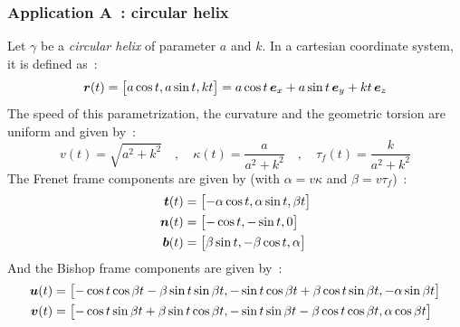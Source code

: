 \subsubsection{Application A~: circular helix}
Let $\gamma$ be a \emph{circular helix} of parameter $a$ and $k$. In a cartesian coordinate system, it is defined as~:
\begin{equation}
	\boldsymbol{r}(t) 
	=
	\begin{bmatrix}
		a \cos t, a \sin t, k t
	\end{bmatrix}
	= a \cos t \, \boldsymbol{e}_x + a \sin t \, \boldsymbol{e}_y + k t \, \boldsymbol{e}_z
\end{equation}
The speed of this parametrization, the curvature and the geometric torsion are uniform and given by~:
\begin{equation}
	v(t) = \sqrt{a^2+k^2}
	\quad,\quad
	\kappa(t) = \frac{a}{a^2 + k^2}
	\quad,\quad
	\tau_f(t) = \frac{k}{a^2 + k^2}
\end{equation}
The Frenet frame components are given by (with $\alpha = v \kappa$ and $\beta = v \tau_f$)~:
\begin{equation}
	\begin{aligned}
	\boldsymbol{t}(t) &=
		\begin{bmatrix} 
			- \alpha \cos t, \alpha \sin t, \beta t 
		\end{bmatrix}
	\\
	\boldsymbol{n}(t) &= 
		\begin{bmatrix} 
			-\cos t, -\sin t, 0 
		\end{bmatrix}
	\\
	\boldsymbol{b}(t) &=
		\begin{bmatrix} 
			\beta \sin t, - \beta \cos t, \alpha
	\end{bmatrix} 	
	\end{aligned}
\end{equation}
And the Bishop frame components are given by~:
\begin{equation}
	\begin{aligned}
		\boldsymbol{u}(t) &= 
		\begin{bmatrix} 	
			-\cos t \cos \beta t - \beta  \sin t \sin \beta t, -\sin t \cos \beta t + \beta  \cos t \sin \beta t, - \alpha \sin \beta t
		\end{bmatrix}
		\\
		\boldsymbol{v}(t) &= 
		\begin{bmatrix} 
			-\cos t \sin \beta t + \beta  \sin t \cos \beta t, -\sin t \sin \beta t - \beta  \cos t \cos \beta t, \alpha \cos \beta t
		\end{bmatrix}
	\end{aligned}
\end{equation}


